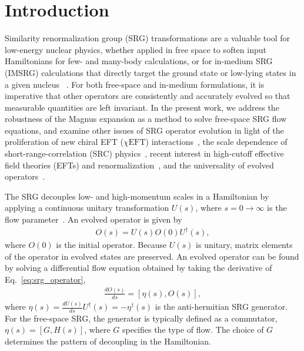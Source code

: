 \documentclass[10pt,aps,prc,floatfix,twocolumn,nofootinbib]{revtex4-1}
\newcommand{\chiEFT}{\ensuremath{\chi{\textrm{EFT}}}}
\begin{document}
\section{Introduction}
\label{sec:intro}


Similarity renormalization group (SRG) transformations are a valuable tool for low-energy nuclear physics, whether applied in free space to soften input Hamiltonians for few- and many-body calculations, or for in-medium SRG (IMSRG) calculations that directly target the ground state or low-lying states in a given nucleus ~\cite{Bogner:2009bt,Furnstahl:2013oba,Hergert:2016iju}.
For both free-space and in-medium formulations, it is imperative that other operators are consistently and accurately evolved so that measurable quantities are left invariant.  
In the present work, we address the robustness of the Magnus expansion as a method to solve free-space SRG flow equations, and examine other issues of SRG operator evolution in light of the proliferation of new chiral EFT (\chiEFT) interactions~\cite{Epelbaum:2014efa,Gezerlis:2014zia,Piarulli:2014bda,Ekstrom:2015rta,Carlsson:2015vda,Reinert:2017usi,Ekstrom:2017koy,Entem:2017gor}, the scale dependence of short-range-correlation (SRC) physics~\cite{Hen:2016kwk,Weiss:2016obx,Cruz-Torres:2019fum,Schmidt:2020kcl}, recent interest in high-cutoff effective field theories (EFTs) and renormalization~\cite{Tews:2018sbi,Hammer:2019poc,vanKolck:2020llt,Tews:2020hgp}, and the universality of evolved operators~\cite{Dainton:2013axa,Arriola:2016fkr}.


The SRG decouples low- and high-momentum scales in a Hamiltonian by applying a continuous unitary transformation $U(s)$, where $s=0 \rightarrow \infty$ is the flow parameter~\cite{Bogner:2006pc}.
An evolved operator is given by
%
\begin{eqnarray}
	\label{eq:srg_operator}
	O(s) = U(s) O(0) U^{\dagger}(s),
\end{eqnarray}
%
where $O(0)$ is the initial operator.
Because $U(s)$ is unitary, matrix elements of the operator in evolved states are preserved.
An evolved operator can be found by solving a differential flow equation obtained by taking the derivative of Eq.~\eqref{eq:srg_operator},
%
\begin{eqnarray}
	\label{eq:srg_flow}
	\frac{dO(s)}{ds} = [\eta(s), O(s)],
\end{eqnarray}
%
where $\eta(s)=\frac{dU(s)}{ds} U^{\dagger}(s) = -\eta^{\dagger}(s)$ is 
the anti-hermitian SRG generator.
For the free-space SRG, the generator is typically defined as a commutator, $\eta(s) = [G, H(s)]$, where $G$ specifies the type of flow.
The choice of $G$ determines the pattern of decoupling in the Hamiltonian.
\end{document}
